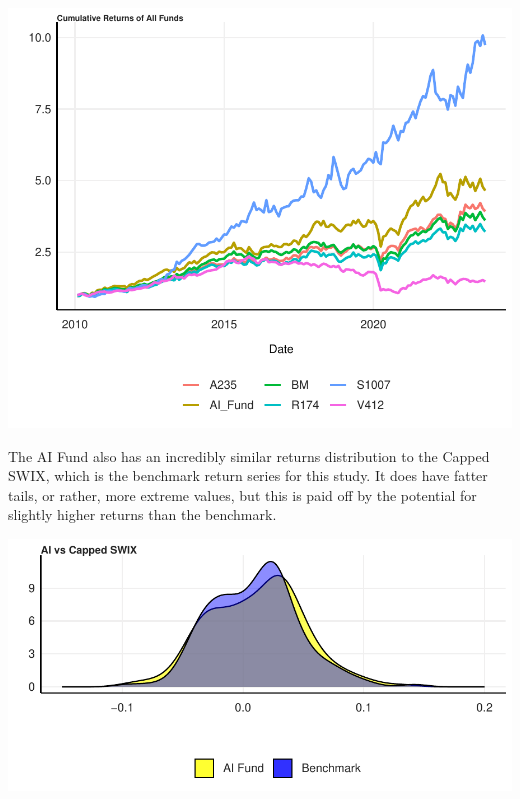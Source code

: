 \documentclass[11pt,preprint, authoryear]{elsarticle}
\let\origfigure\figure
\let\endorigfigure\endfigure
\renewenvironment{figure}[1][2] {
    \expandafter\origfigure\expandafter[H]
} {
    \endorigfigure
}
\numberwithin{equation}{section}
\numberwithin{figure}{section}
\numberwithin{table}{section}
\begin{document}
\begin{figure}[H]

{\centering \includegraphics{Question-1_files/figure-latex/unnamed-chunk-2-1} 

}

\caption{ \label{Figure1.2}}\label{fig:unnamed-chunk-2}
\end{figure}

The AI Fund also has an incredibly similar returns distribution to the
Capped SWIX, which is the benchmark return series for this study. It
does have fatter tails, or rather, more extreme values, but this is paid
off by the potential for slightly higher returns than the benchmark.

\begin{figure}[H]

{\centering \includegraphics{Question-1_files/figure-latex/unnamed-chunk-3-1} 

}

\caption{ \label{Figure1.3}}\label{fig:unnamed-chunk-3}
\end{figure}
\end{document}
